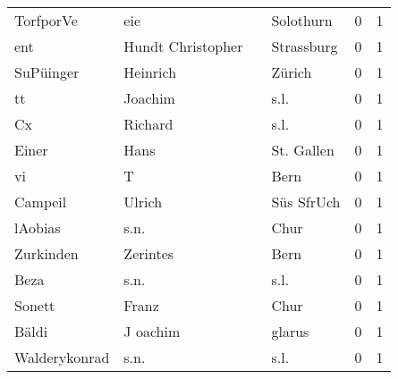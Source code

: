 \documentclass[10pt,a4paper,landscape]{article}
\begin{document}
\begin{longtable}{llllrr}
                TorfporVe &                                eie &             &                                   Solothurn &          0 &         1 \\
                      ent &                  Hundt Christopher &             &                                  Strassburg &          0 &         1 \\
                SuPüinger &                           Heinrich &             &                                      Zürich &          0 &         1 \\
                       tt &                            Joachim &             &                                        s.l. &          0 &         1 \\
                       Cx &                            Richard &             &                                        s.l. &          0 &         1 \\
                    Einer &                               Hans &             &                                  St. Gallen &          0 &         1 \\
                       vi &                                  T &             &                                        Bern &          0 &         1 \\
                  Campeil &                             Ulrich &             &                                  Süs SfrUch &          0 &         1 \\
                  lAobias &                               s.n. &             &                                        Chur &          0 &         1 \\
                Zurkinden &                           Zerintes &             &                                        Bern &          0 &         1 \\
                     Beza &                               s.n. &             &                                        s.l. &          0 &         1 \\
                   Sonett &                              Franz &             &                                        Chur &          0 &         1 \\
                    Bäldi &                           J oachim &             &                                      glarus &          0 &         1 \\
            Walderykonrad &                               s.n. &             &                                        s.l. &          0 &         1 \\

\end{longtable}
\end{document}
